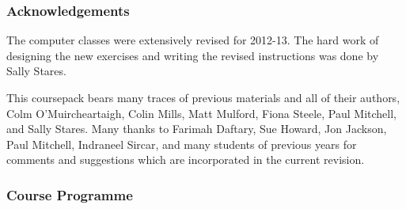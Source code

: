

\subsubsection{Acknowledgements}


The computer classes were extensively revised for 2012-13. The hard work
of designing the new exercises and writing the revised instructions was
done by Sally Stares.

This coursepack bears many traces of previous materials and all of their
authors, Colm O'Muircheartaigh, Colin Mills, Matt Mulford, Fiona Steele,
Paul Mitchell, and Sally Stares. Many thanks to Farimah Daftary, Sue
Howard, Jon Jackson, Paul Mitchell, Indraneel Sircar, and many students
of previous years for comments and suggestions which are incorporated in
the current revision.


\newpage
\subsubsection{Course Programme}

